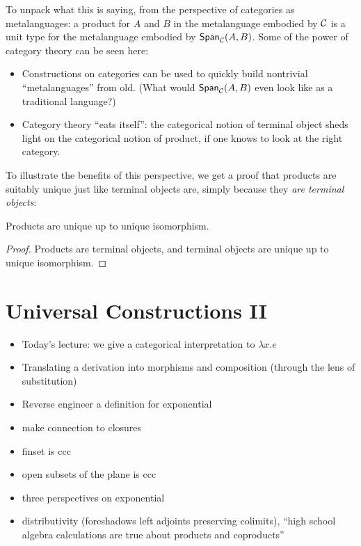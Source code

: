 To unpack what this is saying, from the perspective of categories as metalanguages:
a product for \(A\) and \(B\) in the metalanguage embodied
by \(\mathcal C\) is a unit type for the metalanguage
embodied by \(\mathsf{Span}_\mathcal C(A,B)\).
Some of the power of category theory can be seen here:
\begin{itemize}
\item Constructions on categories can be used to quickly build
  nontrivial ``metalanguages'' from old.
  (What would \(\mathsf{Span}_\mathcal C(A,B)\) even look like as a traditional language?)
\item Category theory ``eats itself'': the categorical notion of terminal object
  sheds light on the categorical notion of product, if one knows to look at
  the right category.
\end{itemize}
To illustrate the benefits of this perspective,
we get a proof that products are suitably unique
just like terminal objects are, simply because they \emph{are terminal objects}:
\begin{proposition}
  Products are unique up to unique isomorphism.
\end{proposition}
\begin{proof}
  Products are terminal objects,
  and terminal objects are unique up to unique isomorphism.
\end{proof}



\chapter{Universal Constructions II}

\begin{itemize}
  \item Today's lecture: we give a categorical interpretation to $\lambda x . e$
  \item Translating a derivation into morphisms and composition (through the lens of substitution)
  \item Reverse engineer a definition for exponential
  \item make connection to closures
  \item finset is ccc 
  \item open subsets of the plane is ccc
  \item three perspectives on exponential 
  \item distributivity (foreshadows left adjoints preserving colimits), ``high school algebra calculations 
  are true about products and coproducts''
\end{itemize}

